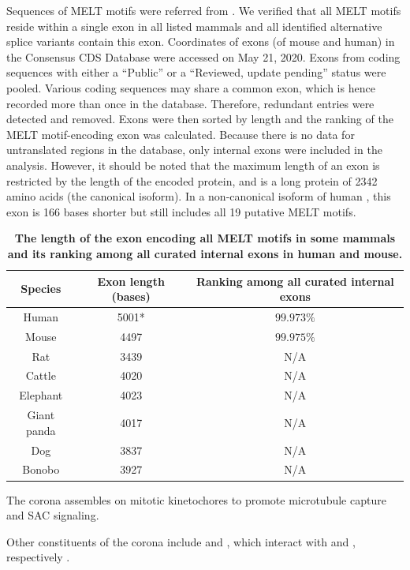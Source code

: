 \begin{table}[H]
    \renewcommand{\arraystretch}{2}
    \caption{\textbf{The length of the exon encoding all MELT motifs in some mammals and its ranking among all curated internal exons in human and mouse.}}
    \noindent\justifying Sequences of MELT motifs were referred from \cite{MELTEvolution}. We verified that all MELT motifs reside within a single exon in all listed mammals and all identified alternative splice variants contain this exon. Coordinates of exons (of mouse and human) in the Consensus CDS Database were accessed on May 21, 2020. Exons from coding sequences with either a ``Public'' or a ``Reviewed, update pending'' status were pooled. Various coding sequences may share a common exon, which is hence recorded more than once in the database. Therefore, redundant entries were detected and removed. Exons were then sorted by length and the ranking of the MELT motif-encoding exon was calculated. Because there is no data for untranslated regions in the database, only internal exons were included in the analysis. However, it should be noted that the maximum length of an exon is restricted by the length of the encoded protein, and  is a long protein of \SI{2342}{} amino acids (the canonical isoform). In a non-canonical isoform of human , this exon is 166 bases shorter but still includes all 19 putative MELT motifs.
    \label{ExonLength}
    \begin{center}
        \begin{tabular}{c c c}
            \hline
            Species & Exon length (bases) & Ranking among all curated internal exons\\
            \hline
            Human & 5001* & $99.973\%$\\
            Mouse & 4497 & $99.975\%$\\
            Rat & 3439 & N/A\\
            Cattle & 4020 & N/A\\
            Elephant & 4023 & N/A\\ %
            Giant panda & 4017 & N/A\\
            Dog & 3837 & N/A\\
            Bonobo & 3927 & N/A\\
            \hline
        \end{tabular}
    \end{center}
\end{table}

The corona assembles on mitotic kinetochores to promote microtubule capture and SAC signaling.

Other constituents of the corona include  and , which interact with  and , respectively \cite{CENPELocalization-BUBR1, CENP-FLimitsStripping}.